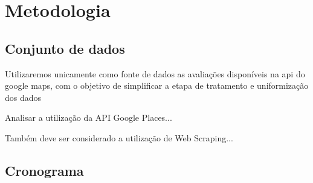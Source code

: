 \chapter{Metodologia}
\label{cap:metodologia}


\section{Conjunto de dados}

Utilizaremos unicamente como fonte de dados as avaliações disponíveis na api do google maps, com o objetivo de simplificar a etapa de tratamento e uniformização dos dados


Analisar a utilização da API Google Places...

Também deve ser considerado a utilização de Web Scraping...

\section{Cronograma}
















